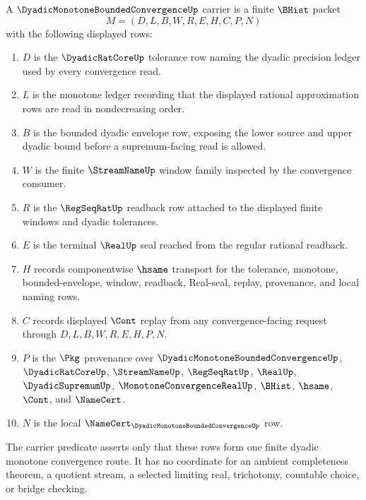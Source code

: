 \begin{definition}
\label{def:dyadic-monotone-bounded-convergence-carrier}
A $\DyadicMonotoneBoundedConvergenceUp$ carrier is a finite $\BHist$ packet
$$
M=(D,L,B,W,R,E,H,C,P,N)
$$
with the following displayed rows:
\begin{enumerate}
\item $D$ is the $\DyadicRatCoreUp$ tolerance row naming the dyadic precision ledger used by every convergence read.
\item $L$ is the monotone ledger recording that the displayed rational approximation rows are read in nondecreasing order.
\item $B$ is the bounded dyadic envelope row, exposing the lower source and upper dyadic bound before a supremum-facing read is allowed.
\item $W$ is the finite $\StreamNameUp$ window family inspected by the convergence consumer.
\item $R$ is the $\RegSeqRatUp$ readback row attached to the displayed finite windows and dyadic tolerances.
\item $E$ is the terminal $\RealUp$ seal reached from the regular rational readback.
\item $H$ records componentwise $\hsame$ transport for the tolerance, monotone, bounded-envelope, window, readback, Real-seal, replay, provenance, and local naming rows.
\item $C$ records displayed $\Cont$ replay from any convergence-facing request through $D,L,B,W,R,E,H,P,N$.
\item $P$ is the $\Pkg$ provenance over $\DyadicMonotoneBoundedConvergenceUp$, $\DyadicRatCoreUp$, $\StreamNameUp$, $\RegSeqRatUp$, $\RealUp$, $\DyadicSupremumUp$, $\MonotoneConvergenceRealUp$, $\BHist$, $\hsame$, $\Cont$, and $\NameCert$.
\item $N$ is the local $\NameCert_{\DyadicMonotoneBoundedConvergenceUp}$ row.
\end{enumerate}
The carrier predicate asserts only that these rows form one finite dyadic monotone convergence route. It has no coordinate for an ambient completeness theorem, a quotient stream, a selected limiting real, trichotomy, countable choice, or bridge checking.
\end{definition}

